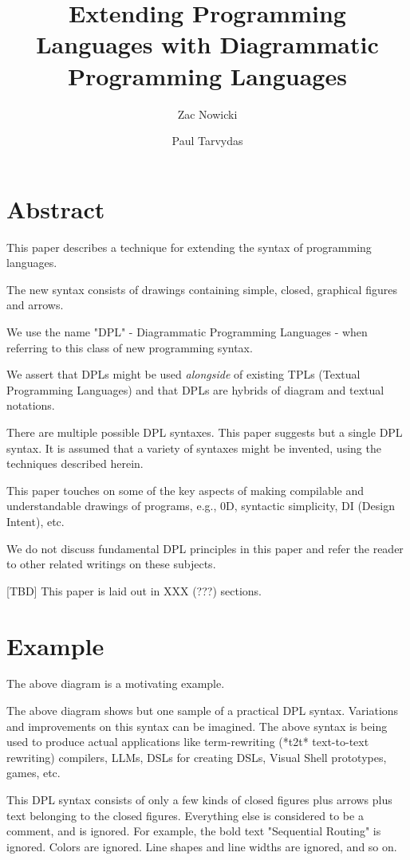 \documentclass{acmart}
\title{Extending Programming Languages with Diagrammatic Programming Languages}
\author{Zac Nowicki}
\affiliation{
  \institution{Kagi Inc.}
  \city{Palo Alto}
  \state{CA}
  \country{USA}
}
\author{Paul Tarvydas}
\affiliation{
  \institution{Retired}
  \city{Toronto}
  \state{Ontario}
  \country{Canada}
}
\begin{document}
\maketitle

\section{Abstract}
This paper describes a technique for extending the syntax of programming languages.

The new syntax consists of drawings containing simple, closed, graphical figures and arrows.

We use the name "DPL" - Diagrammatic Programming Languages - when referring to this class of new programming syntax.

We assert that DPLs might be used \emph{alongside} of existing TPLs (Textual Programming Languages) and that DPLs are hybrids of diagram and textual notations.

There are multiple possible DPL syntaxes. This paper suggests but a single DPL syntax. It is assumed that a variety of syntaxes might be invented, using the techniques described herein.

This paper touches on some of the key aspects of making compilable and understandable drawings of programs, e.g., 0D, syntactic simplicity, DI (Design Intent), etc.

We do not discuss fundamental DPL principles in this paper and refer the reader to other related writings on these subjects.

[TBD] This paper is laid out in XXX (???) sections.

\section{Example}
The above diagram is a motivating example.

The above diagram shows but one sample of a practical DPL syntax. Variations and improvements on this syntax can be imagined. The above syntax is being used to produce actual applications like term-rewriting (*t2t* text-to-text rewriting) compilers, LLMs, DSLs for creating DSLs, Visual Shell prototypes, games, etc.

This DPL syntax consists of only a few kinds of closed figures plus arrows plus text belonging to the closed figures. Everything else is considered to be a comment, and is ignored. For example, the bold text "Sequential Routing" is ignored. Colors are ignored. Line shapes and line widths are ignored, and so on.
\end{document}
